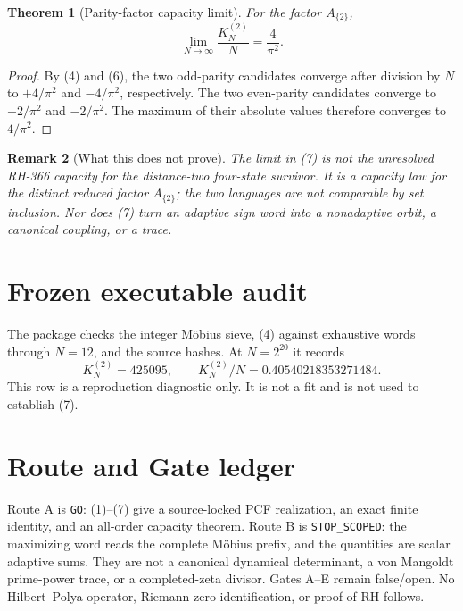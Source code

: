 \documentclass[11pt]{article}
\newtheorem{theorem}{Theorem}[section]
\newtheorem{remark}[theorem]{Remark}
\newcommand{\ParityFactor}{A_{\{2\}}}
\begin{document}
\begin{theorem}[Parity-factor capacity limit]
\label{thm:limit}
For the factor \(\ParityFactor\),
\[
 \boxed{\displaystyle \lim_{N\to\infty}\frac{K_N^{(2)}}N=\frac4{\pi^2}.}
 \tag{7}
\]
\end{theorem}

\begin{proof}
By (4) and (6), the two odd-parity candidates converge after division by
$N$ to $+4/\pi^2$ and $-4/\pi^2$, respectively.  The two even-parity
candidates converge to $+2/\pi^2$ and $-2/\pi^2$.  The maximum of their
absolute values therefore converges to $4/\pi^2$.
\end{proof}

\begin{remark}[What this does not prove]
The limit in (7) is not the unresolved RH-366 capacity for the distance-two
four-state survivor.  It is a capacity law for the distinct reduced factor
\(\ParityFactor\); the two languages are not comparable by set inclusion.
Nor does (7) turn an adaptive
sign word into a nonadaptive orbit, a canonical coupling, or a trace.
\end{remark}

\section{Frozen executable audit}

The package checks the integer M\"obius sieve, (4) against exhaustive words
through $N=12$, and the source hashes.  At $N=2^{20}$ it records
\[
 K_N^{(2)}=425095,
 \qquad K_N^{(2)}/N=0.40540218353271484.
\]
This row is a reproduction diagnostic only.  It is not a fit and is not used
to establish (7).

\section{Route and Gate ledger}

Route A is \texttt{GO}: (1)--(7) give a source-locked PCF realization, an
exact finite identity, and an all-order capacity theorem.  Route B is
\texttt{STOP\_SCOPED}: the maximizing word reads the complete M\"obius prefix,
and the quantities are scalar adaptive sums.  They are not a canonical
dynamical determinant, a von Mangoldt prime-power trace, or a completed-zeta
divisor.  Gates A--E remain false/open.  No Hilbert--Polya operator,
Riemann-zero identification, or proof of RH follows.
\end{document}
